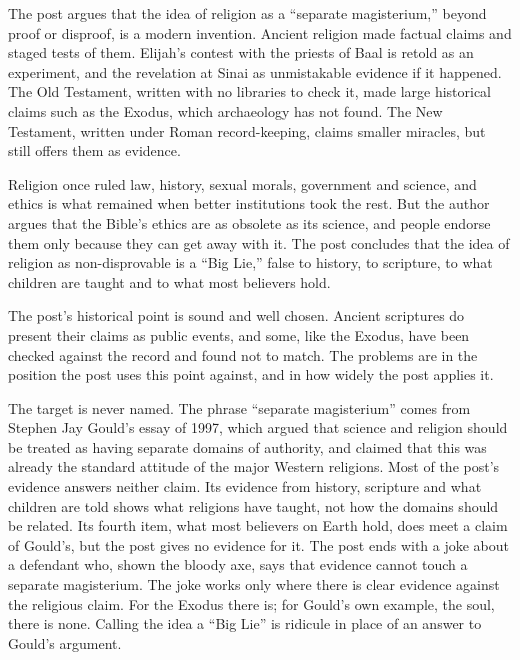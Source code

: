 \begin{afterword}
\summaryhead

The post argues that the idea of religion as a ``separate magisterium,'' beyond proof or disproof, is a modern invention. Ancient religion made factual claims and staged tests of them. Elijah's contest with the priests of Baal is retold as an experiment, and the revelation at Sinai as unmistakable evidence if it happened. The Old Testament, written with no libraries to check it, made large historical claims such as the Exodus, which archaeology has not found. The New Testament, written under Roman record-keeping, claims smaller miracles, but still offers them as evidence.

Religion once ruled law, history, sexual morals, government and science, and ethics is what remained when better institutions took the rest. But the author argues that the Bible's ethics are as obsolete as its science, and people endorse them only because they can get away with it. The post concludes that the idea of religion as non-disprovable is a ``Big Lie,'' false to history, to scripture, to what children are taught and to what most believers hold.

\responsehead

The post's historical point is sound and well chosen. Ancient scriptures do present their claims as public events, and some, like the Exodus, have been checked against the record and found not to match. The problems are in the position the post uses this point against, and in how widely the post applies it.

The target is never named. The phrase ``separate magisterium'' comes from Stephen Jay Gould's essay of 1997, which argued that science and religion should be treated as having separate domains of authority, and claimed that this was already the standard attitude of the major Western religions. Most of the post's evidence answers neither claim. Its evidence from history, scripture and what children are told shows what religions have taught, not how the domains should be related. Its fourth item, what most believers on Earth hold, does meet a claim of Gould's, but the post gives no evidence for it. The post ends with a joke about a defendant who, shown the bloody axe, says that evidence cannot touch a separate magisterium. The joke works only where there is clear evidence against the religious claim. For the Exodus there is; for Gould's own example, the soul, there is none. Calling the idea a ``Big Lie'' is ridicule in place of an answer to Gould's argument.


\end{afterword}
